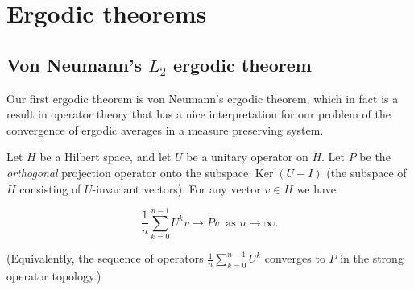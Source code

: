 

\chapter{Ergodic theorems}

\section{Von Neumann's $L_2$ ergodic theorem}
Our first ergodic theorem is von Neumann's ergodic
theorem, which in fact is a result in operator theory
that has a nice interpretation for our problem of the
convergence of ergodic averages in a measure
preserving system.

\begin{thm}
\label{thm-vonneumann}
Let $H$ be a Hilbert space, and let $U$ be a unitary
operator on $H$. Let $P$ be the \emph{orthogonal} projection
operator onto the subspace $\operatorname{Ker}(U-I)$
(the subspace of $H$ consisting of $U$-invariant
vectors). For any vector $v\in H$ we have

\begin{equation*} \tag{17}\label{eq:vonneumann}
\frac{1}{n}\sum_{k=0}^{n-1} U^k v \to Pv \ \textrm{ as }n\to\infty.
\end{equation*}

\noindent (Equivalently, the sequence of operators
$\frac{1}{n}\sum_{k=0}^{n-1} U^k$ converges to $P$ in
the strong operator topology.)
\end{thm}


